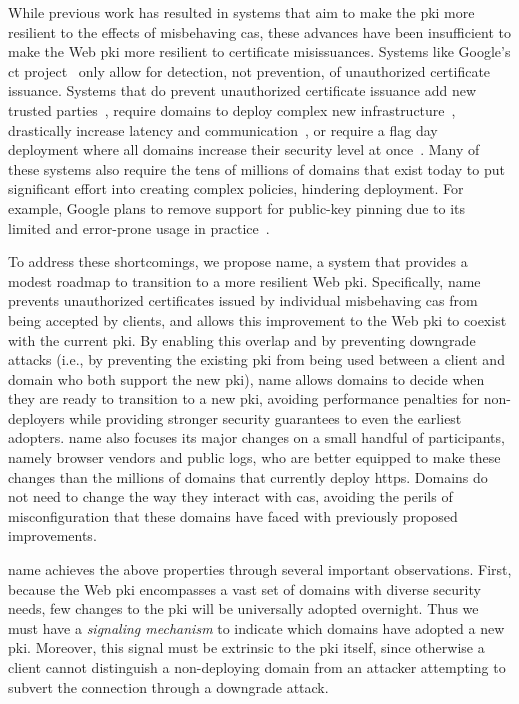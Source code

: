 While previous work has resulted in systems that aim to make the \ac{pki} more
resilient to the effects of misbehaving \acp{ca}, these advances have been
insufficient to make the Web \ac{pki} more resilient to certificate
misissuances. Systems like Google's \ac{ct} project~\cite{rfc6962} only allow
for detection, not prevention, of unauthorized certificate issuance. Systems
that do prevent unauthorized certificate issuance add new trusted
parties~\cite{kim2013accountable}, require domains to deploy complex new
infrastructure~\cite{rfc6698, szalachowski2014policert}, drastically increase
latency and communication~\cite{yu2016dtki}, or require a flag day deployment
where all domains increase their security level at once~\cite{basin2014arpki}.
Many of these systems also require the tens of millions of domains that exist
today to put significant effort into creating complex policies, hindering
deployment. For example, Google plans to remove support for public-key pinning
due to its limited and error-prone usage in practice~\cite{palmer2017intent}.

To address these shortcomings, we propose \acs{name}, a system that provides a
modest roadmap to transition to a more resilient Web \ac{pki}. Specifically,
\ac{name} prevents unauthorized certificates issued by individual misbehaving
\acp{ca} from being accepted by clients, and allows this improvement to the Web
\ac{pki} to coexist with the current \ac{pki}. By enabling this overlap and by
preventing downgrade attacks (i.e., by preventing the existing \ac{pki} from
being used between a client and domain who both support the new \ac{pki}),
\ac{name} allows domains to decide when they are ready to transition to a new
\ac{pki}, avoiding performance penalties for non-deployers while providing
stronger security guarantees to even the earliest adopters. \ac{name} also
focuses its major changes on a small handful of participants, namely browser
vendors and public logs, who are better equipped to make these changes than the
millions of domains that currently deploy \ac{https}. Domains do not need to
change the way they interact with \acp{ca}, avoiding the perils of
misconfiguration that these domains have faced with previously proposed
improvements.

\ac{name} achieves the above properties through several important observations.
First, because the Web \ac{pki} encompasses a vast set of domains with diverse
security needs, few changes to the \ac{pki} will be universally adopted
overnight. Thus we must have a \emph{signaling mechanism} to indicate which
domains have adopted a new \ac{pki}. Moreover, this signal must be extrinsic to
the \ac{pki} itself, since otherwise a client cannot distinguish a non-deploying
domain from an attacker attempting to subvert the connection through a downgrade
attack.

